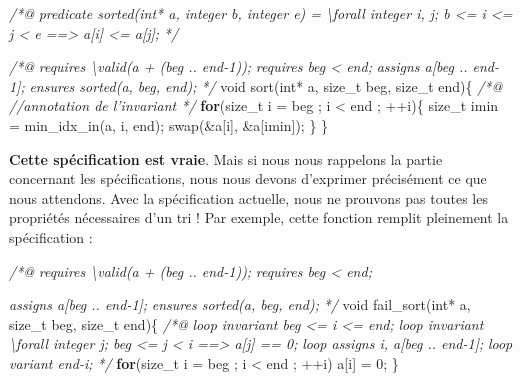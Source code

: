 \documentclass[12pt,francais,]{scrbook}
\newenvironment{Shaded}{}{}
\newcommand{\KeywordTok}[1]{\textcolor[rgb]{0.00,0.44,0.13}{\textbf{{#1}}}}
\newcommand{\DataTypeTok}[1]{\textcolor[rgb]{0.56,0.13,0.00}{{#1}}}
\newcommand{\DecValTok}[1]{\textcolor[rgb]{0.25,0.63,0.44}{{#1}}}
\newcommand{\CommentTok}[1]{\textcolor[rgb]{0.38,0.63,0.69}{\textit{{#1}}}}
\newcommand{\NormalTok}[1]{{#1}}
\begin{document}
\begin{footnotesize}\begin{Shaded}
\begin{Highlighting}[]
\CommentTok{/*@}
\CommentTok{  predicate sorted(int* a, integer b, integer e) =}
\CommentTok{    \textbackslash{}forall integer i, j; b <= i <= j < e ==> a[i] <= a[j];}
\CommentTok{*/}

\CommentTok{/*@}
\CommentTok{  requires \textbackslash{}valid(a + (beg .. end-1));}
\CommentTok{  requires beg < end;}
\CommentTok{  assigns  a[beg .. end-1];}
\CommentTok{  ensures sorted(a, beg, end);}
\CommentTok{*/}
\DataTypeTok{void} \NormalTok{sort(}\DataTypeTok{int}\NormalTok{* a, size_t beg, size_t end)\{}
  \CommentTok{/*@ //annotation de l'invariant */}
  \KeywordTok{for}\NormalTok{(size_t i = beg ; i < end ; ++i)\{}
    \NormalTok{size_t imin = min_idx_in(a, i, end);}
    \NormalTok{swap(&a[i], &a[imin]);}
  \NormalTok{\}}
\NormalTok{\}}
\end{Highlighting}
\end{Shaded}\end{footnotesize}

\textbf{Cette spécification est vraie}. Mais si nous nous rappelons la
partie concernant les spécifications, nous nous devons d'exprimer
précisément ce que nous attendons. Avec la spécification actuelle, nous
ne prouvons pas toutes les propriétés nécessaires d'un tri ! Par
exemple, cette fonction remplit pleinement la spécification :

\begin{footnotesize}\begin{Shaded}
\begin{Highlighting}[]
\CommentTok{/*@}
\CommentTok{  requires \textbackslash{}valid(a + (beg .. end-1));}
\CommentTok{  requires beg < end;}

\CommentTok{  assigns  a[beg .. end-1];}
\CommentTok{  }
\CommentTok{  ensures sorted(a, beg, end);}
\CommentTok{*/}
\DataTypeTok{void} \NormalTok{fail_sort(}\DataTypeTok{int}\NormalTok{* a, size_t beg, size_t end)\{}
  \CommentTok{/*@}
\CommentTok{    loop invariant beg <= i <= end;}
\CommentTok{    loop invariant \textbackslash{}forall integer j; beg <= j < i ==> a[j] == 0;}
\CommentTok{    loop assigns i, a[beg .. end-1];}
\CommentTok{    loop variant end-i;}
\CommentTok{  */}
  \KeywordTok{for}\NormalTok{(size_t i = beg ; i < end ; ++i)}
    \NormalTok{a[i] = }\DecValTok{0}\NormalTok{;}
\NormalTok{\}}
\end{Highlighting}
\end{Shaded}\end{footnotesize}
\end{document}
